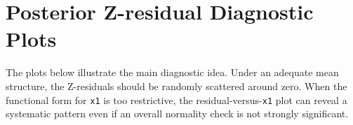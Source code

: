 \documentclass[
  english,
  letterpaper,
  DIV=11,
  numbers=noendperiod]{scrartcl}
\newenvironment{Shaded}{\begin{snugshade}}{\end{snugshade}}
\newcommand{\AttributeTok}[1]{\textcolor[rgb]{0.40,0.45,0.13}{#1}}
\newcommand{\FunctionTok}[1]{\textcolor[rgb]{0.28,0.35,0.67}{#1}}
\newcommand{\NormalTok}[1]{\textcolor[rgb]{0.00,0.23,0.31}{#1}}
\newcommand{\OtherTok}[1]{\textcolor[rgb]{0.00,0.23,0.31}{#1}}
\newcommand{\SpecialCharTok}[1]{\textcolor[rgb]{0.37,0.37,0.37}{#1}}
\begin{document}
\begin{Shaded}
\end{Shaded}

\section{Posterior Z-residual Diagnostic
Plots}\label{posterior-z-residual-diagnostic-plots}

The plots below illustrate the main diagnostic idea. Under an adequate
mean structure, the Z-residuals should be randomly scattered around
zero. When the functional form for \texttt{x1} is too restrictive, the
residual-versus-\texttt{x1} plot can reveal a systematic pattern even if
an overall normality check is not strongly significant.
\end{document}

